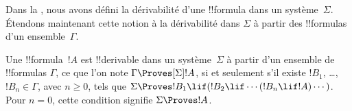 \documentclass[../../../include/open-logic-section]{subfiles}
\begin{document}


Dans la , nous avons défini la dérivabilité d'une
!!{formula} dans un système~$\Sigma$. Étendons maintenant cette notion
à la dérivabilité dans $\Sigma$ à partir des !!{formula}s d'un
ensemble~$\Gamma$.

\begin{defn}
  Une !!{formula}~$!A$ est !!{derivable} dans un système~$\Sigma$ à
  partir d'un ensemble de !!{formula}s $\Gamma$, ce que l'on note
  $\Gamma \Proves[\Sigma] !A$, si et seulement s'il existe
  $!B_1$, \dots, $!B_n \in \Gamma$, avec $n \ge 0$, tels que
  $\Sigma \Proves !B_1 \lif (!B_2 \lif \cdots (!B_n \lif !A)
  \cdots)$. Pour $n=0$, cette condition signifie $\Sigma \Proves !A$.
\end{defn}
\end{document}
